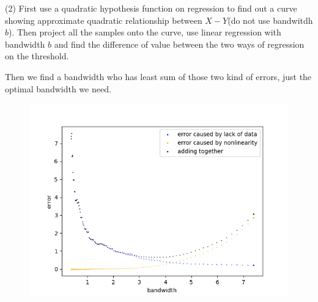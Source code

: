 \documentclass[a4 paper,12pt]{article}
\begin{document}
(2) First use a quadratic hypothesis function on regression to find out a curve showing approximate quadratic relationship between $X-Y$(do not use bandwitdh $b$). Then project all the samples onto the curve, use linear regression with bandwidth $b$ and find the difference of value between the two ways of regression on the threshold. 

Then we find a bandwidth who has least sum of those two kind of errors, just the optimal bandwidth we need.

\begin{figure}[h]
	\centering
	\includegraphics[scale=1]{Figure_5.png}
\end{figure}
\end{document}

